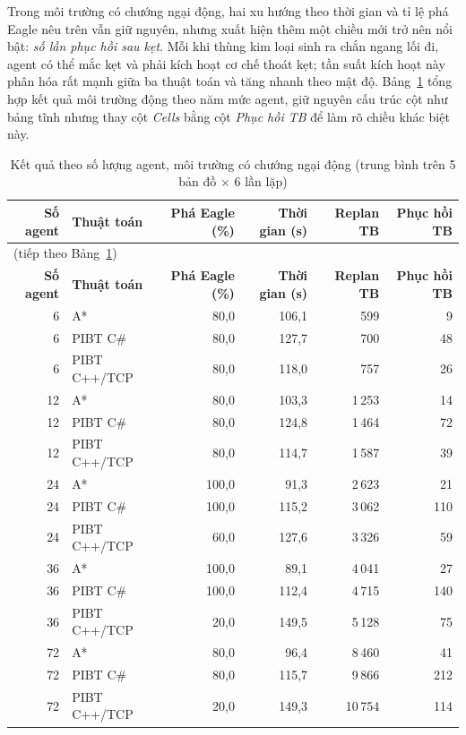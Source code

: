 \documentclass[../DoAn.tex]{subfiles}
\begin{document}
Trong môi trường có chướng ngại động, hai xu hướng theo thời gian và tỉ lệ phá Eagle nêu trên vẫn
giữ nguyên, nhưng xuất hiện thêm một chiều mới trở nên nổi bật: \emph{số lần phục hồi sau kẹt}. Mỗi
khi thùng kim loại sinh ra chắn ngang lối đi, agent có thể mắc kẹt và phải kích hoạt cơ chế thoát
kẹt; tần suất kích hoạt này phân hóa rất mạnh giữa ba thuật toán và tăng nhanh theo mật độ.
Bảng~\ref{tab:scaling_dynamic} tổng hợp kết quả môi trường động theo năm mức agent, giữ nguyên cấu
trúc cột như bảng tĩnh nhưng thay cột \emph{Cells} bằng cột \emph{Phục hồi TB} để làm rõ chiều khác
biệt này.

{\footnotesize\setlength{\tabcolsep}{4pt}
\begin{longtable}{|r|l|r|r|r|r|}
\caption{Kết quả theo số lượng agent, môi trường có chướng ngại động (trung bình trên 5 bản đồ \(\times\) 6 lần lặp)}
\label{tab:scaling_dynamic} \\
\hline
\textbf{Số agent} & \textbf{Thuật toán} & \textbf{Phá Eagle (\%)} & \textbf{Thời gian (s)} & \textbf{Replan TB} & \textbf{Phục hồi TB} \\ \hline
\endfirsthead
\multicolumn{6}{|l|}{\small (tiếp theo Bảng~\ref{tab:scaling_dynamic})} \\ \hline
\textbf{Số agent} & \textbf{Thuật toán} & \textbf{Phá Eagle (\%)} & \textbf{Thời gian (s)} & \textbf{Replan TB} & \textbf{Phục hồi TB} \\ \hline
\endhead
 6 & A*           & 80,0 & 106,1 & 599 & 9 \\
 6 & PIBT C\#     & 80,0 & 127,7 & 700 & 48 \\
 6 & PIBT C++/TCP & 80,0 & 118,0 & 757 & 26 \\
\hline
12 & A*           & 80,0 & 103,3 & 1\,253 & 14 \\
12 & PIBT C\#     & 80,0 & 124,8 & 1\,464 & 72 \\
12 & PIBT C++/TCP & 80,0 & 114,7 & 1\,587 & 39 \\
\hline
24 & A*           & 100,0 & 91,3 & 2\,623 & 21 \\
24 & PIBT C\#     & 100,0 & 115,2 & 3\,062 & 110 \\
24 & PIBT C++/TCP & 60,0 & 127,6 & 3\,326 & 59 \\
\hline
36 & A*           & 100,0 & 89,1 & 4\,041 & 27 \\
36 & PIBT C\#     & 100,0 & 112,4 & 4\,715 & 140 \\
36 & PIBT C++/TCP & 20,0 & 149,5 & 5\,128 & 75 \\
\hline
72 & A*           & 80,0 & 96,4 & 8\,460 & 41 \\
72 & PIBT C\#     & 80,0 & 115,7 & 9\,866 & 212 \\
72 & PIBT C++/TCP & 20,0 & 149,3 & 10\,754 & 114 \\
\hline
\end{longtable}
}
\end{document}
